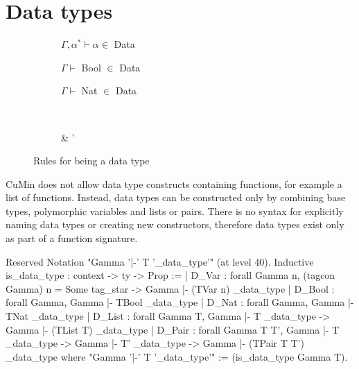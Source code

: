 \documentclass[fleqn, abstract=on]{scrreprt}
\begin{document}
\section{Data types}
\begin{figure}[H]
	\begin{center}
		\begin{subfigure}{.25 \linewidth}
			\centering
			$\Gamma, \alpha^{*} \vdash \alpha \in$ Data
		\end{subfigure}
		\begin{subfigure}{.25 \linewidth}
			\centering
			$\Gamma \vdash$ Bool $\in$ Data
		\end{subfigure}
		\begin{subfigure}{.25 \linewidth}
			\centering
			$\Gamma \vdash$ Nat $\in$ Data
		\end{subfigure}\\
		\vspace{1em}
		\begin{subfigure}{.375 \linewidth}
			\centering
			      {\Gamma \vdash \tau \in {}}
		\end{subfigure}
		\hspace{.1 \linewidth}
		\begin{subfigure}{.375 \linewidth}
			\centering
			      {\Gamma \vdash \tau \in {} & \Gamma \vdash \tau' \in {}}
		\end{subfigure}
	\end{center}
	\caption{Rules for being a data type}
\end{figure}
CuMin does not allow data type constructs containing functions, for example a list of functions. Instead, data types can be constructed only by combining base types, polymorphic variables and lists or pairs. There is no syntax for explicitly naming data types or creating new constructors, therefore data types exist only as part of a function signature.
\begin{coqcode}
Reserved Notation "Gamma '|-' T '\is_data_type'" (at level 40).
Inductive is_data_type : context -> ty -> Prop :=
  | D_Var  : forall Gamma n,
               (tagcon Gamma) n  = Some tag_star ->
               Gamma |- (TVar n) \is_data_type
  | D_Bool : forall Gamma, Gamma |- TBool \is_data_type
  | D_Nat  : forall Gamma, Gamma |- TNat \is_data_type
  | D_List : forall Gamma T,
               Gamma |- T \is_data_type ->
               Gamma |- (TList T) \is_data_type
  | D_Pair : forall Gamma T T', 
               Gamma |- T \is_data_type ->
               Gamma |- T' \is_data_type ->
               Gamma |- (TPair T T') \is_data_type
where "Gamma '|-' T '\is_data_type'" := (is_data_type Gamma T).
\end{coqcode}
\end{document}

